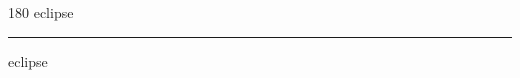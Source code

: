 
\begin{frame}
\begin{center}
\begin{turn}{180}
{\fontsize{2.5cm}{1em}\selectfont eclipse}
\end{turn}
\vspace{1em}\par  
\hrule
\vspace{1em}\par  
{\fontsize{2.5cm}{1em}\selectfont eclipse}
\end{center}
\end{frame}
